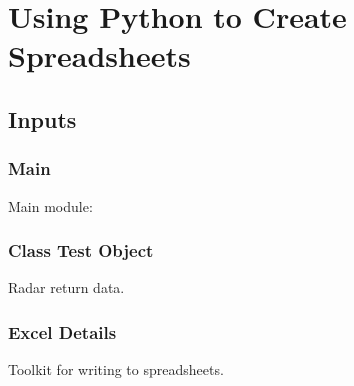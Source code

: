 % 

\section{Using Python to Create Spreadsheets}

\subsection{Inputs}

\subsubsection{Main}
Main module: 
		

\subsubsection{Class Test Object}	
Radar return data.
		

\subsubsection{Excel Details}	
Toolkit for writing to spreadsheets.
		

\endinput  %
